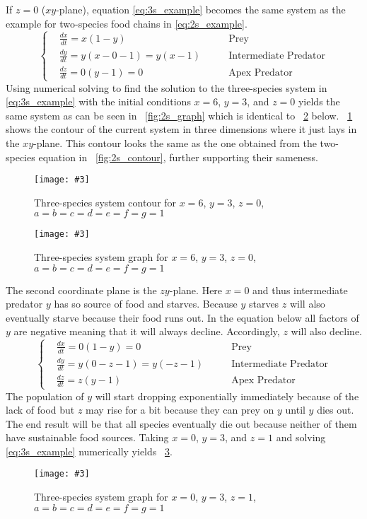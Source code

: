 \documentclass[12pt,a4paper,reqno]{amsart}
\newcommand{\figref}[1]{\textsc{\figurename}~\ref{#1}}
\newcommand{\makefig}[4]{
\begin{figure}[#1]
    \captionsetup{justification=centering}
    \texttt{[image: \#3]}
    \caption{#4}
    \label{fig:#3}
\end{figure}
}
\begin{document}
If $z=0$ ($xy$-plane), equation \eqref{eq:3s_example} becomes the same system
as the example for two-species food chains in \eqref{eq:2s_example}.
\begin{equation}\nonumber
    \left\{\begin{aligned}
        &\frac{dx}{dt} = x(1 - y)              &\text{Prey}\\
        &\frac{dy}{dt} = y(x - 0 - 1) = y(x-1) 
            \qquad &\text{Intermediate Predator}\\
        &\frac{dz}{dt} = 0(y - 1) = 0             &\text{Apex Predator}
    \end{aligned}\right.
\end{equation}
Using numerical solving to find the solution to the three-species system in
\eqref{eq:3s_example} with the initial conditions $x=6$, $y=3$, and $z=0$
yields the same system as can be seen in \figref{fig:2s_graph} which is
identical to \figref{fig:3s_z_zero_graph} below. \figref{fig:3s_z_zero_contour}
shows the contour of the current system in three dimensions where it just lays
in the $xy$-plane. This contour looks the same as the one obtained from the
two-species equation in \figref{fig:2s_contour}, further supporting their
sameness.
\makefig{H}{0.7\textwidth}{3s_z_zero_contour}{Three-species system contour for
$x=6$, $y=3$, $z=0$, $a=b=c=d=e=f=g=1$}
\makefig{H}{0.7\textwidth}{3s_z_zero_graph}{Three-species system graph for
$x=6$, $y=3$, $z=0$, $a=b=c=d=e=f=g=1$}

The second coordinate plane is the $zy$-plane. Here $x=0$ and thus intermediate
predator $y$ has so source of food and starves. Because $y$ starves $z$ will
also eventually starve because their food runs out. In the equation below all
factors of $y$ are negative meaning that it will always decline. Accordingly,
$z$ will also decline.
\begin{equation}\nonumber
    \left\{\begin{aligned}
        &\frac{dx}{dt} = 0(1 - y) = 0              &\text{Prey}\\
        &\frac{dy}{dt} = y(0 - z - 1)=y(-z-1) 
            \qquad &\text{Intermediate Predator}\\
        &\frac{dz}{dt} = z(y - 1)             &\text{Apex Predator}
    \end{aligned}\right.
\end{equation}
The population of $y$ will start dropping exponentially immediately because of
the lack of food but $z$ may rise for a bit because they can prey on $y$ until
$y$ dies out. The end result will be that all species eventually die out
because neither of them have sustainable food sources. Taking $x=0$, $y=3$, and
$z=1$ and solving \eqref{eq:3s_example} numerically yields
\figref{fig:3s_x_zero_graph}.
\makefig{h}{\textwidth}{3s_x_zero_graph}{Three-species system graph for
$x=0$, $y=3$, $z=1$, $a=b=c=d=e=f=g=1$}
\end{document}
